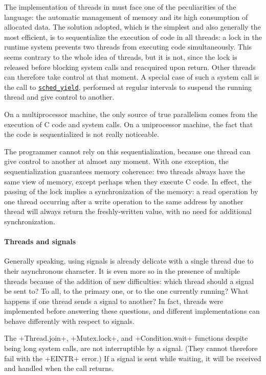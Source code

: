 The implementation of threads in {\ocaml} must face one of the
peculiarities of the {\ocaml} language: the automatic management of
memory and its high consumption of allocated data.  The solution
adopted, which is the simplest and also generally the most efficient,
is to sequentialize the execution of {\ocaml} code in all threads: a
lock in the runtime system prevents two threads from executing
{\ocaml} code simultaneously.  This seems contrary to the whole idea
of threads, but it is not, since the lock is released before blocking
system calls and reacquired upon return.  Other threads can therefore
take control at that moment.  A special case of such a system call is
the call to
\href{http://www.opengroup.org/onlinepubs/007908799/xsh/sched_yield.html}%
{\texttt{sched\_yield}},
performed at regular intervals to suspend the running thread and give
control to another.

On a multiprocessor machine, the only source of true parallelism comes
from the execution of C code and system calls.  On a uniprocessor
machine, the fact that the {\ocaml} code is sequentialized is not
really noticeable.

The programmer cannot rely on this sequentialization, because one
thread can give control to another at almost any moment.  With one
exception, the sequentialization guarantees memory coherence: two
threads always have the same view of memory, except perhaps when they
execute C code.  In effect, the passing of the lock implies a
synchronization of the memory: a read operation by one thread
occurring after a write operation to the same address by another
thread will always return the freshly-written value, with no need for
additional synchronization.

\paragraph {Threads and signals}

Generally speaking, using signals is already delicate with a single
thread due to their asynchronous character.  It is even more so in the
presence of multiple threads because of the addition of new
difficulties: which thread should a signal be sent to?  To all, to the
primary one, or to the one currently running?  What happens if one
thread sends a signal to another?  In fact, threads were implemented
before answering these questions, and different implementations can
behave differently with respect to signals.

The \ml+Thread.join+, \ml+Mutex.lock+, and \ml+Condition.wait+ functions
despite being long system calls, are not interruptible by a signal.
(They cannot therefore fail with the \ml+EINTR+ error.)  If a signal
is sent while waiting, it will be received and handled when the call
returns.

